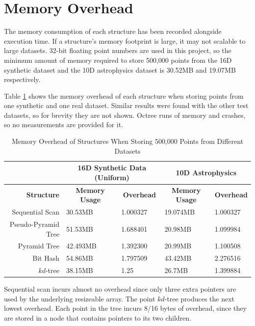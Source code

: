 \section{Memory Overhead}

The memory consumption of each structure has been recorded alongside execution time. If a structure's memory footprint is large, it may not scalable to large datasets. 32-bit floating point numbers are used in this project, so the minimum amount of memory required to store 500,000 points from the 16D synthetic dataset and the 10D astrophysics dataset is 30.52MB and 19.07MB respectively.

Table \ref{tab:memory-overhead} shows the memory overhead of each structure when storing points from one synthetic and one real dataset. Similar results were found with the other test datasets, so for brevity they are not shown. Octree runs of memory and crashes, so no measurements are provided for it.

\begin{table}
	\centering
	\begin{tabular}{|r|l|l|l|l|}
		\hline
		& \multicolumn{2}{|c|}{\textbf{16D Synthetic Data (Uniform)}} & \multicolumn{2}{|c|}{\textbf{10D Astrophysics}} \\ 
		\hline
		\textbf{Structure} & \multicolumn{1}{|c|}{\textbf{Memory Usage}} & \multicolumn{1}{|c|}{\textbf{Overhead}} & \multicolumn{1}{|c|}{\textbf{Memory Usage}} & \multicolumn{1}{|c|}{\textbf{Overhead}} \\
		\hline
		Sequential Scan & 30.53MB & 1.000327 & 19.074MB & 1.000327 \\
		Pseudo-Pyramid Tree & 51.53MB & 1.688401 & 20.98MB & 1.099984 \\
		Pyramid Tree & 42.493MB & 1.392300 & 20.99MB & 1.100508 \\
		Bit Hash & 54.86MB & 1.797509 & 43.42MB & 2.276516 \\
		$kd$-tree & 38.15MB & 1.25 & 26.7MB & 1.399884 \\
		\hline
	\end{tabular}
	\caption{Memory Overhead of Structures When Storing 500,000 Points from Different Datasets}
	\label{tab:memory-overhead}
\end{table}

Sequential scan incurs almost no overhead since only three extra pointers are used by the underlying resizeable array. The point $kd$-tree produces the next lowest overhead. Each point in the tree incurs 8/16 bytes of overhead, since they are stored in a node that contains pointers to its two children. 

